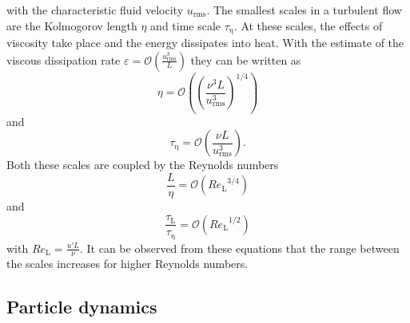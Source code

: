 \documentclass[11pt,a4paper,openany,oneside,parskip=half*]{article}
\begin{document}
with the characteristic fluid velocity $u_{\mathrm{rms}}$.
\newline
The smallest scales in a turbulent flow are the Kolmogorov length $\eta$ and time scale $\tau_\mathrm{\eta}$. At these scales, the effects of viscosity take place and the energy dissipates into heat. With the estimate of the viscous dissipation rate $\varepsilon = \mathcal{O} \left(\frac{u_{\mathrm{rms}}^3}{L} \right)$ they can be written as
\begin{equation}
\eta = \mathcal{O} \left( \left(\frac{\nu^3 L}{u_\mathrm{rms}^3} \right)^{1/4}\right)
\end{equation}
and
\begin{equation}
\tau_\mathrm{\eta} = \mathcal{O} \left(\frac{\nu L}{u_\mathrm{rms}^3} \right).
\end{equation}
Both these scales are coupled by the Reynolds numbers
\begin{equation}
\frac{L}{\eta} = \mathcal{O} \left({Re_{\mathrm{L}}}^{3/4}\right)
\end{equation}
and
\begin{equation}
\frac{\tau_\mathrm{L}}{\tau_\mathrm{\eta}} = \mathcal{O} \left({Re_\mathrm{L}}^{1/2}\right)
\end{equation}
with $Re_\mathrm{L} = \frac{u' L}{\nu}$.
It can be observed from these equations that the range between the scales increases for higher Reynolds numbers. 
\newline
\subsection{Particle dynamics} %
\end{document}

